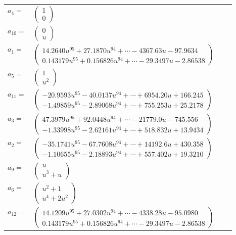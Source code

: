 \documentclass[1p]{elsarticle_modified}
\theoremstyle{definition}
\begin{document}
\begin{tabular}{m{7pt} m{180pt} m{7pt} m{180pt} }
\flushright $a_{4}=$&$\begin{pmatrix}1\\0\end{pmatrix}$ \\
\flushright $a_{10}=$&$\begin{pmatrix}0\\u\end{pmatrix}$ \\
\flushright $a_{1}=$&$\begin{pmatrix}14.2640 u^{95}+27.1870 u^{94}+\cdots-4367.63 u-97.9634\\0.143179 u^{95}+0.156826 u^{94}+\cdots-29.3497 u-2.86538\end{pmatrix}$ \\
\flushright $a_{5}=$&$\begin{pmatrix}1\\u^2\end{pmatrix}$ \\
\flushright $a_{11}=$&$\begin{pmatrix}-20.9593 u^{95}-40.0137 u^{94}+\cdots+6954.20 u+166.245\\-1.49859 u^{95}-2.89068 u^{94}+\cdots+755.253 u+25.2178\end{pmatrix}$ \\
\flushright $a_{3}=$&$\begin{pmatrix}47.3979 u^{95}+92.0448 u^{94}+\cdots-21779.0 u-745.556\\-1.33998 u^{95}-2.62161 u^{94}+\cdots+518.832 u+13.9434\end{pmatrix}$ \\
\flushright $a_{2}=$&$\begin{pmatrix}-35.1741 u^{95}-67.7608 u^{94}+\cdots+14192.6 u+430.358\\-1.10655 u^{95}-2.18893 u^{94}+\cdots+557.402 u+19.3210\end{pmatrix}$ \\
\flushright $a_{9}=$&$\begin{pmatrix}u\\u^3+u\end{pmatrix}$ \\
\flushright $a_{6}=$&$\begin{pmatrix}u^2+1\\u^4+2 u^2\end{pmatrix}$ \\
\flushright $a_{12}=$&$\begin{pmatrix}14.1209 u^{95}+27.0302 u^{94}+\cdots-4338.28 u-95.0980\\0.143179 u^{95}+0.156826 u^{94}+\cdots-29.3497 u-2.86538\end{pmatrix}$ \\

\end{tabular}
\end{document}
